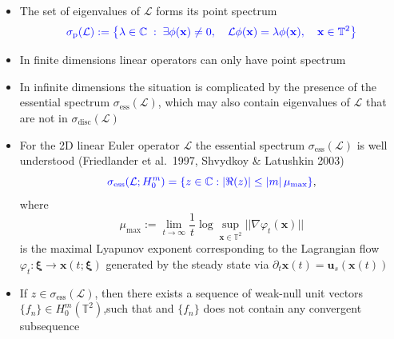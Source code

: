 \documentclass{beamer}
\def\Bmp#1{ \begin{minipage}{#1} }
\def\Emp{ \end{minipage} }
\def\L{{\mathcal{L}}}
\def\TT{{\mathbb{T}}}
\def\CC{{\mathbb{C}}}
\def\blue#1{{\color{blue}{ #1 }}}
\newcommand{\bds}{\boldsymbol}
\newcommand{\mbb}[1]{\mathbb{#1}}
\def\x{{\bf x}}
\def\bxi{\boldsymbol{\xi}}
\newcommand{\sigdis}{\sigma_{\text{disc}}}
\newcommand{\sigess}{\sigma_{\text{ess}}}
\def\sigp{\sigma_{\text{p}}}
\def\mumax{\mu_{\text{max}}}
\begin{document}
\frame
{
\hspace*{-0.75cm}
\Bmp{12cm}
\raggedright

\begin{itemize}
\item<1-> 
The set of eigenvalues of $\L$ forms its point spectrum
\begin{equation*}
\blue{{\sigp(\L) := \left\{ \lambda \in \CC \; : \; \exists \phi (\x) \neq 0,  \quad \L \phi (\x) = \lambda \phi (\x), \quad \x \in \TT^2  \right\}}}
\end{equation*}

\bigskip
\item<2->
In finite dimensions linear operators can only have point spectrum

\bigskip
\item<3-> In infinite dimensions the situation is complicated by the
  presence of the essential spectrum $\sigess(\L)$, which may also contain
  eigenvalues of $\L$ that are not in $\sigdis(\L)$

\end{itemize}

     
\Emp
}



\frame
{
\hspace*{-0.75cm}
\Bmp{12cm}
\raggedright

\begin{itemize}
\item<1-> For the 2D linear Euler operator $\L$ the essential spectrum
  $\sigess(\L)$ is well understood (Friedlander et al.~1997, Shvydkoy
  \& Latushkin 2003)
\begin{equation*}
  \blue{\sigess(\L; H^{m}_0) = \{ z\in \CC: |\Re(z)| \leq |m| \, \mumax \}},
\end{equation*}
where 
\begin{equation*}
\mumax :=  \lim_{t\to\infty} \frac{1}{t}\log \sup_{\bds x\in\mbb T^2} ||\nabla \varphi_t(\bds x)||
\end{equation*}
is the maximal Lyapunov exponent corresponding
to the Lagrangian flow $\varphi_t: \bxi \to \bds x(t; \bxi)$ generated
by the steady state via $\partial_t \bds x(t) = \bds u_s (\bds x(t))$

\medskip
\item<2-> If $z \in \sigess(\L)$, then there exists a sequence of
  weak-null unit vectors
  ${\{f_n\} \in H^m_0(\TT^2)}$,\/\blue{approximate eigenvectors,}\/such
  that
  \blue{$$\|(\L - z) f_n \|_{H^m} \rightarrow 0, \qquad n \rightarrow
    \infty$$} and $\{f_n\}$ does not contain any convergent
  subsequence
\end{itemize}

     
\Emp
}
\end{document}
